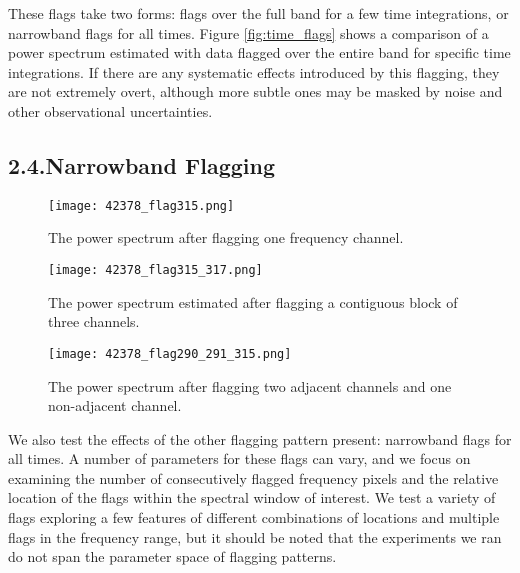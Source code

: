 \documentclass[12pt]{article}
\begin{document}
These flags take two forms: flags over the full band for a few time integrations, or narrowband flags for all times. Figure \ref{fig:time_flags} shows a comparison of a power spectrum estimated with data flagged over the entire band for specific time integrations. If there are any systematic effects introduced by this flagging, they are not extremely overt, although more subtle ones may be masked by noise and other observational uncertainties. \vspace{3mm}

\tocless\subsection{\hypertarget{subsec:narrowband}{2.4.\hspace{0.75em}Narrowband Flagging}}

\begin{figure}[p]
	\centering
	\texttt{[image: 42378\_flag315.png]}
	\caption[Power spectrum calculated with flagged time integrations and one flagged channel]{The power spectrum after flagging one frequency channel.}
	\label{fig:flag_chan315}
\end{figure}

\begin{figure}[p]
	\centering
	\texttt{[image: 42378\_flag315\_317.png]}
	\caption[Power spectrum calculated with flagged time integrations and three contiguous flagged channels]{The power spectrum estimated after flagging a contiguous block of three channels.}
	\label{fig:flag_chan315_317}
\end{figure}

\begin{figure}[p]
	\centering
	\texttt{[image: 42378\_flag290\_291\_315.png]}
	\caption[Power spectrum calculated with flagged time integrations and three flagged channels (two contiguous, one not)]{The power spectrum after flagging two adjacent channels and one non-adjacent channel.}
	\label{fig:flag_chan290_291_315}
\end{figure}

We also test the effects of the other flagging pattern present: narrowband flags for all times. A number of parameters for these flags can vary, and we focus on examining the number of consecutively flagged frequency pixels and the relative location of the flags within the spectral window of interest. We test a variety of flags exploring a few features of different combinations of locations and multiple flags in the frequency range, but it should be noted that the experiments we ran do not span the parameter space of flagging patterns.
\end{document}
